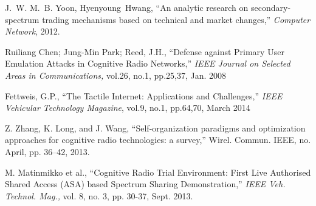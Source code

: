 \begin{thebibliography}{1}
J.~W. M.~B. Yoon, Hyenyoung~Hwang, ``An analytic research on secondary-spectrum
  trading mechanisms based on technical and market changes,'' \emph{Computer
  Network}, 2012.

 Ruiliang Chen; Jung-Min Park; Reed, J.H., \enquote{Defense against Primary User Emulation Attacks in Cognitive Radio Networks,} \textit{IEEE Journal on Selected Areas in Communications,} vol.26, no.1, pp.25,37, Jan. 2008

 Fettweis, G.P., \enquote {The Tactile Internet: Applications and Challenges,} \textit{IEEE Vehicular Technology Magazine}, vol.9, no.1, pp.64,70, March 2014

Z. Zhang, K. Long, and J. Wang, “Self-organization paradigms and optimization approaches for cognitive radio technologies: a survey,” Wirel. Commun. IEEE, no. April, pp. 36–42, 2013.

 M. Matinmikko et al., \enquote{Cognitive Radio Trial Environment: First Live Authorised Shared Access (ASA) based Spectrum Sharing Demonstration,} \textit{IEEE Veh. Technol. Mag.,} vol. 8, no. 3, pp. 30-37, Sept. 2013.

\end{thebibliography}